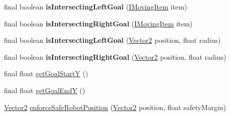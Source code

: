 \begin{DoxyCompactItemize}
\item 
\hypertarget{classairhockeyjava_1_1physical_1_1_table_a14f60f982903d6f3cd6eddebaa4cba7e}{}final boolean {\bfseries is\+Intersecting\+Left\+Goal} (\hyperlink{interfaceairhockeyjava_1_1physical_1_1_i_moving_item}{I\+Moving\+Item} item)\label{classairhockeyjava_1_1physical_1_1_table_a14f60f982903d6f3cd6eddebaa4cba7e}

\item 
\hypertarget{classairhockeyjava_1_1physical_1_1_table_ab52a28ba1dd5cd3b3db7d87f02955b46}{}final boolean {\bfseries is\+Intersecting\+Right\+Goal} (\hyperlink{interfaceairhockeyjava_1_1physical_1_1_i_moving_item}{I\+Moving\+Item} item)\label{classairhockeyjava_1_1physical_1_1_table_ab52a28ba1dd5cd3b3db7d87f02955b46}

\item 
\hypertarget{classairhockeyjava_1_1physical_1_1_table_adbe7c347134fcc5bc54ad44e1cdd3247}{}final boolean {\bfseries is\+Intersecting\+Left\+Goal} (\hyperlink{classairhockeyjava_1_1util_1_1_vector2}{Vector2} position, float radius)\label{classairhockeyjava_1_1physical_1_1_table_adbe7c347134fcc5bc54ad44e1cdd3247}

\item 
\hypertarget{classairhockeyjava_1_1physical_1_1_table_a77600fe89f1453b24f0aa3336954dd7b}{}final boolean {\bfseries is\+Intersecting\+Right\+Goal} (\hyperlink{classairhockeyjava_1_1util_1_1_vector2}{Vector2} position, float radius)\label{classairhockeyjava_1_1physical_1_1_table_a77600fe89f1453b24f0aa3336954dd7b}

\item 
final float \hyperlink{classairhockeyjava_1_1physical_1_1_table_a022933dc0583c5b052cc84debb283468}{get\+Goal\+Start\+Y} ()
\item 
final float \hyperlink{classairhockeyjava_1_1physical_1_1_table_ac78d5750581a32101ee3f45e8b065823}{get\+Goal\+End\+Y} ()
\item 
\hyperlink{classairhockeyjava_1_1util_1_1_vector2}{Vector2} \hyperlink{classairhockeyjava_1_1physical_1_1_table_ac4634237a50ec92731e27ecb08ae06f7}{enforce\+Safe\+Robot\+Position} (\hyperlink{classairhockeyjava_1_1util_1_1_vector2}{Vector2} position, float safety\+Margin)
\end{DoxyCompactItemize}
